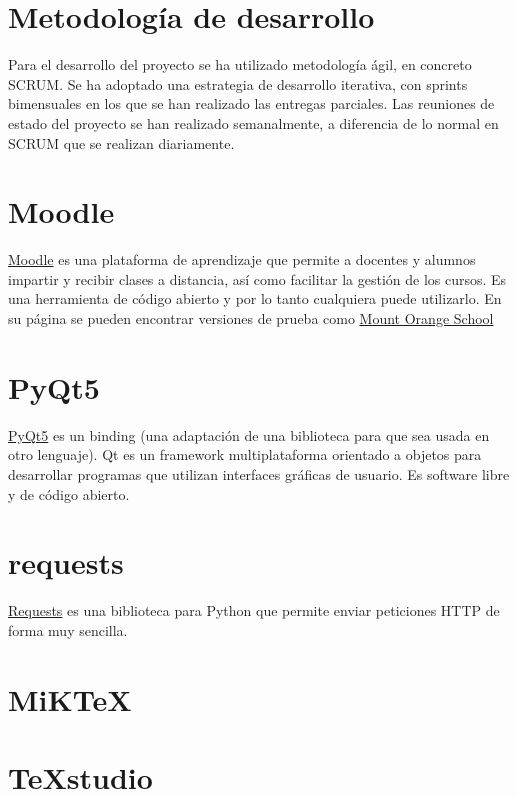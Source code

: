 
\section{Metodología de desarrollo}
Para el desarrollo del proyecto se ha utilizado metodología ágil, en concreto SCRUM. Se ha adoptado una estrategia de desarrollo iterativa, con sprints bimensuales en los que se han realizado las entregas parciales. Las reuniones de estado del proyecto se han realizado semanalmente, a diferencia de lo normal en SCRUM que se realizan diariamente.
\section{Moodle}
\href{https://moodle.org/}{Moodle} es una plataforma de aprendizaje que permite a docentes y alumnos impartir y recibir clases a distancia, así como facilitar la gestión de los cursos. Es una herramienta de código abierto y por lo tanto cualquiera puede utilizarlo. En su página se pueden encontrar versiones de prueba como \href{https://school.moodledemo.net/}{Mount Orange School}
\section{PyQt5}
\href{https://doc.qt.io/qtforpython/}{PyQt5} es un binding (una adaptación de una biblioteca para que sea usada en otro lenguaje). Qt es un framework multiplataforma orientado a objetos para desarrollar programas que utilizan interfaces gráficas de usuario. Es software libre y de código abierto.
\section{requests}
\href{https://requests.readthedocs.io/es/latest/}{Requests} es una biblioteca para Python que permite enviar peticiones HTTP de forma muy sencilla.
\section{MiKTeX}
\section{TeXstudio}